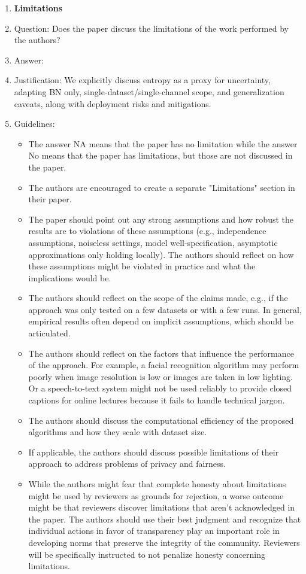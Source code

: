 \documentclass{article}
\begin{document}
\begin{enumerate}
\item {\bf Limitations}
    \item[] Question: Does the paper discuss the limitations of the work performed by the authors?
    \item[] Answer: \answerYes{}
    \item[] Justification: We explicitly discuss entropy as a proxy for uncertainty, adapting BN only, single-dataset/single-channel scope, and generalization caveats, along with deployment risks and mitigations.
    \item[] Guidelines:
    \begin{itemize}
        \item The answer NA means that the paper has no limitation while the answer No means that the paper has limitations, but those are not discussed in the paper. 
        \item The authors are encouraged to create a separate "Limitations" section in their paper.
        \item The paper should point out any strong assumptions and how robust the results are to violations of these assumptions (e.g., independence assumptions, noiseless settings, model well-specification, asymptotic approximations only holding locally). The authors should reflect on how these assumptions might be violated in practice and what the implications would be.
        \item The authors should reflect on the scope of the claims made, e.g., if the approach was only tested on a few datasets or with a few runs. In general, empirical results often depend on implicit assumptions, which should be articulated.
        \item The authors should reflect on the factors that influence the performance of the approach. For example, a facial recognition algorithm may perform poorly when image resolution is low or images are taken in low lighting. Or a speech-to-text system might not be used reliably to provide closed captions for online lectures because it fails to handle technical jargon.
        \item The authors should discuss the computational efficiency of the proposed algorithms and how they scale with dataset size.
        \item If applicable, the authors should discuss possible limitations of their approach to address problems of privacy and fairness.
        \item While the authors might fear that complete honesty about limitations might be used by reviewers as grounds for rejection, a worse outcome might be that reviewers discover limitations that aren't acknowledged in the paper. The authors should use their best judgment and recognize that individual actions in favor of transparency play an important role in developing norms that preserve the integrity of the community. Reviewers will be specifically instructed to not penalize honesty concerning limitations.
    \end{itemize}


\end{enumerate}
\end{document}

